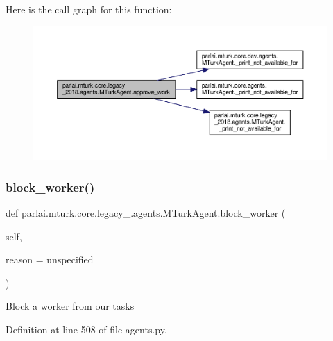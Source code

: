 Here is the call graph for this function\+:
\nopagebreak
\begin{figure}[H]
\begin{center}
\leavevmode
\includegraphics[width=350pt]{classparlai_1_1mturk_1_1core_1_1legacy__2018_1_1agents_1_1MTurkAgent_a814894377ea555da46004a6459e30418_cgraph}
\end{center}
\end{figure}
\mbox{\label{classparlai_1_1mturk_1_1core_1_1legacy__2018_1_1agents_1_1MTurkAgent_a50e51af01741ae9de7178971e9dc9f0e}} 
\subsubsection{\texorpdfstring{block\+\_\+worker()}{block\_worker()}}
{\footnotesize\ttfamily def parlai.\+mturk.\+core.\+legacy\+\_.\+agents.\+M\+Turk\+Agent.\+block\+\_\+worker (\begin{DoxyParamCaption}\item[{}]{self,  }\item[{}]{reason = {\ttfamily \textquotesingle{}unspecified\textquotesingle{}} }\end{DoxyParamCaption})}

\begin{DoxyVerb}Block a worker from our tasks\end{DoxyVerb}
 

Definition at line 508 of file agents.\+py.



